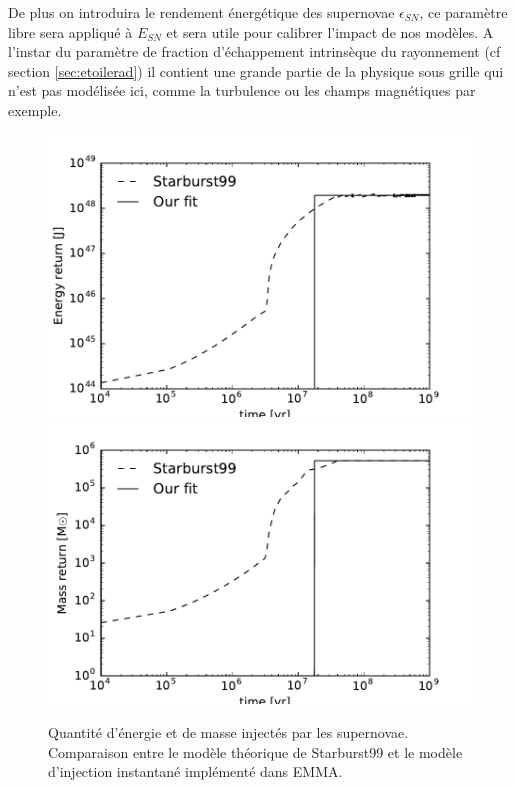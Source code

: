 De plus on introduira le rendement énergétique des supernovae $\epsilon_{SN}$, ce paramètre libre sera appliqué à $E_{SN}$ et sera utile pour calibrer l'impact de nos modèles.
A l'instar du paramètre de fraction d'échappement intrinsèque du rayonnement (cf section \ref{sec:etoilerad}) il contient une grande partie de la physique sous grille qui n'est pas modélisée ici, comme la turbulence ou les champs magnétiques par exemple.

\begin{figure}
        \includegraphics[width=.95\textwidth]{img/03/energy_loss.pdf} 
		\includegraphics[width=.95\textwidth]{img/03/mass_loss.pdf} 
        \caption[Calibration des supernovæ]{ Quantité d'énergie et de masse injectés par les supernovae. 
        Comparaison entre le modèle théorique de Starburst99 et le modèle d'injection instantané implémenté dans EMMA.
 		\label{fig:SNloss}}
\end{figure}


